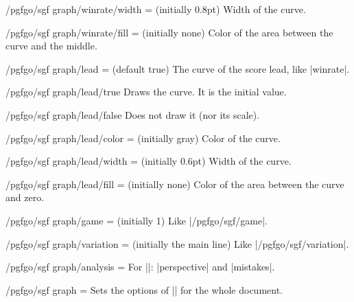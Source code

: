 \begin{key}{/pgfgo/sgf graph/winrate/width =  (initially 0.8pt)}
	Width of the curve.
\end{key}

\begin{key}{/pgfgo/sgf graph/winrate/fill =  (initially none)}
	Color of the area between the curve and the middle.

	\begin{codeexample}[]
	\end{codeexample}
\end{key}

\begin{key}{/pgfgo/sgf graph/lead =  (default true)}
	The curve of the score lead, like |winrate|.
\end{key}

\begin{stylekey}{/pgfgo/sgf graph/lead/true}
	Draws the curve. It is the initial value.
\end{stylekey}

\begin{stylekey}{/pgfgo/sgf graph/lead/false}
	Does not draw it (nor its scale).
\end{stylekey}

\begin{key}{/pgfgo/sgf graph/lead/color =  (initially gray)}
	Color of the curve.
\end{key}

\begin{key}{/pgfgo/sgf graph/lead/width =  (initially 0.6pt)}
	Width of the curve.
\end{key}

\begin{key}{/pgfgo/sgf graph/lead/fill =  (initially none)}
	Color of the area between the curve and zero.
\end{key}

\begin{key}{/pgfgo/sgf graph/game =  (initially 1)}
	Like |/pgfgo/sgf/game|.
\end{key}

\begin{key}{/pgfgo/sgf graph/variation =  (initially the main line)}
	Like |/pgfgo/sgf/variation|.
\end{key}

\begin{key}{/pgfgo/sgf graph/analysis = }
	For |\sgfgraph|: |perspective| and |mistakes|.
\end{key}

\begin{key}{/pgfgo/sgf graph = }
	Sets the options of |\sgfgraph| for the whole document.
\end{key}
